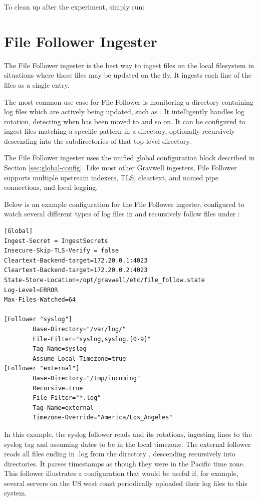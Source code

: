To clean up after the experiment, simply run:


\clearpage
\section{File Follower Ingester}
The File Follower ingester is the best way to ingest files on the local
filesystem in situations where those files may be updated on the fly. It
ingests each line of the files as a single entry.

The most common use case for File Follower is monitoring a directory
containing log files which are actively being updated, such
as . It intelligently handles log rotation, detecting when
 has been moved to  and so on. It can be configured to
ingest files matching a specific pattern in a directory, optionally
recursively descending into the subdirectories of that top-level
directory.

The File Follower ingester uses the unified global configuration block
described in Section \ref{sec:global-config}. Like most other Gravwell ingesters,
File Follower supports multiple upstream indexers, TLS, cleartext, and
named pipe connections, and local logging.

Below is an example configuration for the File Follower ingester,
configured to watch several different types of log files in
 and recursively follow files under :

\begin{Verbatim}[breaklines=true]
[Global]
Ingest-Secret = IngestSecrets
Insecure-Skip-TLS-Verify = false
Cleartext-Backend-target=172.20.0.1:4023
Cleartext-Backend-target=172.20.0.2:4023
State-Store-Location=/opt/gravwell/etc/file_follow.state
Log-Level=ERROR
Max-Files-Watched=64

[Follower "syslog"]
        Base-Directory="/var/log/"
        File-Filter="syslog,syslog.[0-9]" 
        Tag-Name=syslog
        Assume-Local-Timezone=true
[Follower "external"]
        Base-Directory="/tmp/incoming"
        Recursive=true
        File-Filter="*.log"
        Tag-Name=external
        Timezone-Override="America/Los_Angeles"
\end{Verbatim}

In this example, the syslog follower reads  and
its rotations, ingesting lines to the syslog tag and assuming dates to
be in the local timezone. The external follower reads all files ending
in .log from the directory , descending recursively
into directories. It parses timestamps as though they were in the
Pacific time zone. This follower illustrates a configuration that would
be useful if, for example, several servers on the US west coast
periodically uploaded their log files to this system.

